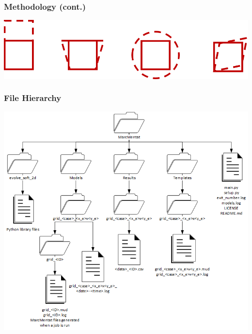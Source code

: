 \documentclass[serif, pdf]{beamer}
\begin{document}

\begin{frame}
    \frametitle{Methodology (cont.)}
    \begin{center}
        \includegraphics[width=1\linewidth]{Example-Shapes.png}
    \end{center}
\end{frame}


\begin{frame}
    \frametitle{File Hierarchy}
	\begin{center}
        \includegraphics[width=0.8\linewidth]{File-Hierarchy.png}
    \end{center}
\end{frame}

\end{document}
